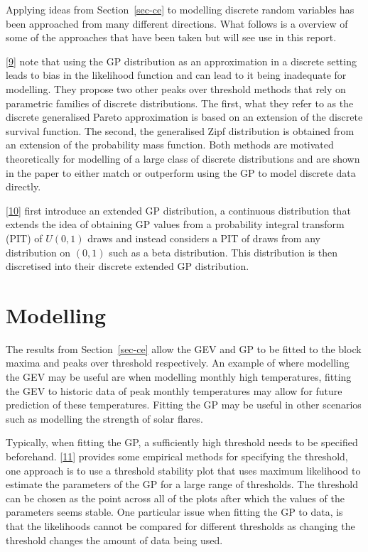 \documentclass[
  10pt,
  a4paper,
]{scrreprt}
\theoremstyle{plain}
\theoremstyle{definition}
\theoremstyle{plain}
\theoremstyle{remark}
\begin{document}
{Applying ideas from Section~\ref{sec-ce} to modelling discrete random
variables has been approached from many different directions. What
follows is a overview of some of the approaches that have been taken but
will see use in this report.

{[}\protect\hyperlink{ref-hds24}{9}{]} note that using the GP
distribution as an approximation in a discrete setting leads to bias in
the likelihood function and can lead to it being inadequate for
modelling. They propose two other peaks over threshold methods that rely
on parametric families of discrete distributions. The first, what they
refer to as the discrete generalised Pareto approximation is based on an
extension of the discrete survival function. The second, the generalised
Zipf distribution is obtained from an extension of the probability mass
function. Both methods are motivated theoretically for modelling of a
large class of discrete distributions and are shown in the paper to
either match or outperform using the GP to model discrete data directly.

{[}\protect\hyperlink{ref-agn22}{10}{]} first introduce an extended GP
distribution, a continuous distribution that extends the idea of
obtaining GP values from a probability integral transform (PIT) of
\(U(0,1)\) draws and instead considers a PIT of draws from any
distribution on \((0,1)\) such as a beta distribution. This distribution
is then discretised into their discrete extended GP distribution.

\hypertarget{sec-mod}{%
\section{Modelling}\label{sec-mod}}

The results from Section~\ref{sec-ce} allow the GEV and GP to be fitted
to the block maxima and peaks over threshold respectively. An example of
where modelling the GEV may be useful are when modelling monthly high
temperatures, fitting the GEV to historic data of peak monthly
temperatures may allow for future prediction of these temperatures.
Fitting the GP may be useful in other scenarios such as modelling the
strength of solar flares.

Typically, when fitting the GP, a sufficiently high threshold needs to
be specified beforehand. {[}\protect\hyperlink{ref-coles2001}{11}{]}
provides some empirical methods for specifying the threshold, one
approach is to use a threshold stability plot that uses maximum
likelihood to estimate the parameters of the GP for a large range of
thresholds. The threshold can be chosen as the point across all of the
plots after which the values of the parameters seems stable. One
particular issue when fitting the GP to data, is that the likelihoods
cannot be compared for different thresholds as changing the threshold
changes the amount of data being used.

}
\end{document}
